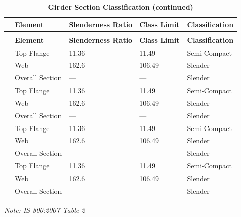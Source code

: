 \documentclass[12pt,a4paper]{report}
\numberwithin{table}{chapter}
\numberwithin{figure}{chapter}
\begin{document}
\vspace{1em}
\begin{longtable}{|C{2.5cm}|L{3cm}|C{3.5cm}|C{2.5cm}|>{\centering\arraybackslash}p{4.0cm}|}
\caption{\textbf{Girder Section Classification}}\\
\hline
\textbf{} & \textbf{Element} & \textbf{Slenderness Ratio} & \textbf{Class Limit} & \textbf{Classification} \\[6pt]
\hline
\endfirsthead
\caption[]{\textbf{Girder Section Classification (continued)}}\\
\hline
\textbf{} & \textbf{Element} & \textbf{Slenderness Ratio} & \textbf{Class Limit} & \textbf{Classification} \\[6pt]
\hline
\endhead
\hline
\endfoot
\endlastfoot
{} & Top Flange & 11.36 & 11.49 & Semi-Compact \\[6pt]
 & Web & 162.6 & 106.49 & Slender \\[6pt]
 & Overall Section & --- & --- & Slender \\[6pt]
\hline
{} & Top Flange & 11.36 & 11.49 & Semi-Compact \\[6pt]
 & Web & 162.6 & 106.49 & Slender \\[6pt]
 & Overall Section & --- & --- & Slender \\[6pt]
\hline
{} & Top Flange & 11.36 & 11.49 & Semi-Compact \\[6pt]
 & Web & 162.6 & 106.49 & Slender \\[6pt]
 & Overall Section & --- & --- & Slender \\[6pt]
\hline
{} & Top Flange & 11.36 & 11.49 & Semi-Compact \\[6pt]
 & Web & 162.6 & 106.49 & Slender \\[6pt]
 & Overall Section & --- & --- & Slender \\[6pt]
\hline
\end{longtable}
\noindent\textit{Note: IS 800:2007 Table 2}
\end{document}
